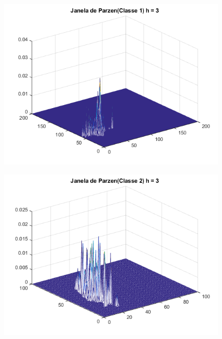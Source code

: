 \documentclass[12pt,twoside]{report}
\begin{document}
\begin{figure}[ht]
    \centering
    \includegraphics[scale=0.7]{parzen_c1_h3}
    \caption{}
    \label{fig:parzen_c1_h3}
\end{figure}

\begin{figure}[ht]
    \centering
    \includegraphics[scale=0.7]{parzen_c2_h3}
    \caption{}
    \label{fig:parzen_c2_h3}
\end{figure}
\end{document}
